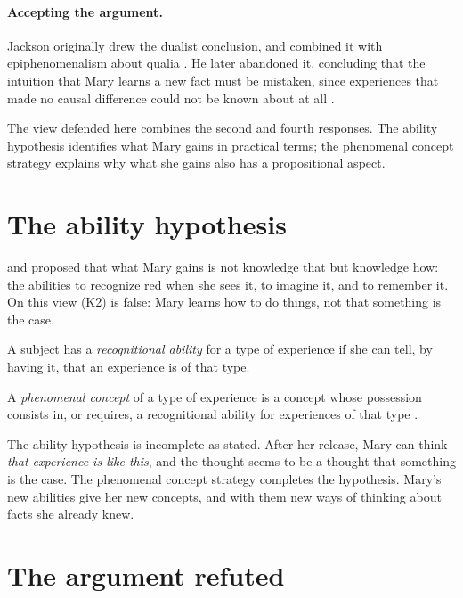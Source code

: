 \documentclass{situationist-preprint}
\begin{document}
\paragraph{Accepting the argument.} Jackson originally drew the dualist conclusion, and combined it with epiphenomenalism about qualia \citep{Jackson1982}. He later abandoned it, concluding that the intuition that Mary learns a new fact must be mistaken, since experiences that made no causal difference could not be known about at all \citep{Jackson1998}.

The view defended here combines the second and fourth responses. The ability hypothesis identifies what Mary gains in practical terms; the phenomenal concept strategy explains why what she gains also has a propositional aspect.

\section{The ability hypothesis}

\citet{Lewis1988} and \citet{Nemirow1990} proposed that what Mary gains is not knowledge that but knowledge how: the abilities to recognize red when she sees it, to imagine it, and to remember it. On this view (K2) is false: Mary learns how to do things, not that something is the case.

\begin{definition}\label{d:ability}
A subject has a \emph{recognitional ability} for a type of experience if she can tell, by having it, that an experience is of that type.
\end{definition}

\begin{definition}\label{d:concept}
A \emph{phenomenal concept} of a type of experience is a concept whose possession consists in, or requires, a recognitional ability for experiences of that type \citep{Loar1990}.
\end{definition}

The ability hypothesis is incomplete as stated. After her release, Mary can think \emph{that experience is like this}, and the thought seems to be a thought that something is the case. The phenomenal concept strategy completes the hypothesis. Mary's new abilities give her new concepts, and with them new ways of thinking about facts she already knew.

\section{The argument refuted}
\end{document}
